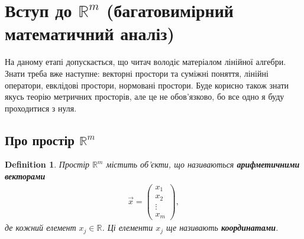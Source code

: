 \documentclass[a4paper, 10pt]{article}
\theoremstyle{theoremdd}
\theoremstyle{theoremdd}
\theoremstyle{theoremdd}
\newtheorem{definition}[theorem]{Definition}
\theoremstyle{theoremdd}
\theoremstyle{theoremdd}
\theoremstyle{theoremdd}
\theoremstyle{theoremdd}
\theoremstyle{theoremdd}
\theoremstyle{theoremdd}
\begin{document}
\newpage
\section{Вступ до $\mathbb{R}^m$ (багатовимірний математичний аналіз)}
На даному етапі допускається, що читач володіє матеріалом лінійної алгебри. Знати треба вже наступне: векторні простори та суміжні поняття, лінійні оператори, евклідові простори, нормовані простори. Буде корисно також знати якусь теорію метричних просторів, але це не обов'язково, бо все одно я буду проходитися з нуля.

\subsection{Про простір $\mathbb{R}^m$}
\begin{definition}
Простір $\mathbb{R}^m$ містить об'єкти, що називаються \textbf{арифметичними векторами}
\begin{align*}
\vec{x} = \begin{pmatrix}
x_1 \\ x_2 \\ \vdots \\ x_m
\end{pmatrix},
\end{align*}
де кожний елемент $x_j \in \mathbb{R}$. Ці елементи $x_j$ ще називають \textbf{координатами}.
\end{definition}
\end{document}
